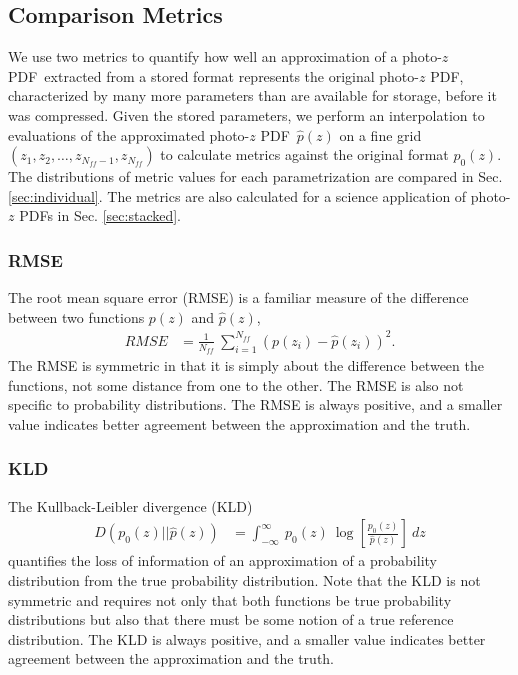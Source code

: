 \documentclass[\docopts]{\docclass}
\newcommand{\pz}{photo-$z$ PDF}
\begin{document}
\subsection{Comparison Metrics}
\label{sec:metrics}


We use two metrics to quantify how well an approximation of a \pz\ extracted 
from a stored format represents the original \pz, characterized by many more 
parameters than are available for storage, before it was compressed.  Given the 
stored parameters, we perform an interpolation to evaluations of the 
approximated \pz\ $\hat{p}(z)$ on a fine grid $(z_{1}, z_{2}, \dots, 
z_{N_{ff}-1}, z_{N_{ff}})$ to calculate metrics against the original format 
$p_{0}(z)$.  The distributions of metric values for each parametrization are 
compared in Sec. \ref{sec:individual}.  The metrics are also calculated for a 
science application of \pz s in Sec. \ref{sec:stacked}.

\subsubsection{RMSE}
\label{sec:rms}

The root mean square error (RMSE) is a familiar measure of the difference 
between two functions $p(z)$ and $\hat{p}(z)$,
\begin{align}
  \label{eq:rmse}
  RMSE &= \frac{1}{N_{ff}}\ \sum_{i=1}^{N_{ff}} (p(z_{i}) - \hat{p}(z_{i}))^{2}.
\end{align}
The RMSE is symmetric in that it is simply about the difference between the 
functions, not some distance from one to the other.  The RMSE is also not 
specific to probability distributions.  The RMSE is always positive, and a 
smaller value indicates better agreement between the approximation and the 
truth.

\subsubsection{KLD}
\label{sec:kld}

The Kullback-Leibler divergence (KLD)
\begin{align}
  \label{eq:kld}
  D(p_{0}(z) || \hat{p}(z)) &= \int_{-\infty}^{\infty}\ p_{0}(z)\ 
\log\left[\frac{p_{0}(z)}{\hat{p}(z)}\right]\ dz
\end{align}
quantifies the loss of information of an approximation of a probability 
distribution from the true probability distribution.  Note that the KLD is not 
symmetric and requires not only that both functions be true probability 
distributions but also that there must be some notion of a true reference 
distribution.  The KLD is always positive, and a smaller value indicates better 
agreement between the approximation and the truth.
\end{document}
